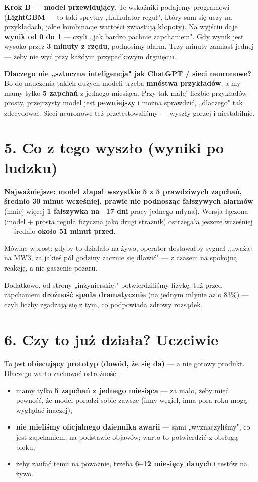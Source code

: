 \documentclass[12pt,a4paper]{article}
\newcommand{\waz}[1]{\textcolor{akcent}{\textbf{#1}}}
\begin{document}
\textbf{Krok B --- model przewidujący.} Te wskaźniki podajemy programowi
(\waz{LightGBM} --- to taki sprytny „kalkulator reguł", który sam się uczy na
przykładach, jakie kombinacje wartości zwiastują kłopoty). Na wyjściu daje
\waz{wynik od 0 do 1} --- czyli „jak bardzo pachnie zapchaniem". Gdy wynik jest
wysoko przez \waz{3 minuty z rzędu}, podnosimy alarm. Trzy minuty zamiast jednej ---
żeby nie wyć przy każdym przypadkowym drgnięciu.

\begin{infobox}
\textbf{Dlaczego nie „sztuczna inteligencja" jak ChatGPT / sieci neuronowe?}
Bo do nauczenia takich dużych modeli trzeba \waz{mnóstwa przykładów}, a my mamy
tylko \waz{5 zapchań} z jednego miesiąca. Przy tak małej liczbie przykładów prosty,
przejrzysty model jest \waz{pewniejszy} i można sprawdzić, „dlaczego" tak zdecydował.
Sieci neuronowe też przetestowaliśmy --- wyszły gorzej i niestabilnie.
\end{infobox}

\section*{5. Co z tego wyszło (wyniki po ludzku)}

\begin{infobox}
\textbf{Najważniejsze: model złapał \waz{wszystkie 5 z 5} prawdziwych zapchań,
średnio \waz{30 minut wcześniej}, prawie nie podnosząc fałszywych alarmów}
(mniej więcej \waz{1 fałszywka na ~17 dni} pracy jednego młyna). Wersja
łączona (model + prosta reguła fizyczna jako drugi strażnik) ostrzegała jeszcze
wcześniej --- średnio \waz{około 51 minut przed}.
\end{infobox}

Mówiąc wprost: gdyby to działało na żywo, operator dostawałby sygnał „uważaj na MW3,
za jakieś pół godziny zacznie się dławić" --- z czasem na spokojną reakcję, a nie
gaszenie pożaru.

Dodatkowo, od strony „inżynierskiej" potwierdziliśmy fizykę: tuż przed zapchaniem
\waz{drożność spada dramatycznie} (na jednym młynie aż o 83\%) --- czyli liczby
zgadzają się z tym, co podpowiada zdrowy rozsądek.

\section*{6. Czy to już działa? Uczciwie}

To jest \waz{obiecujący prototyp (dowód, że się da)} --- a nie gotowy produkt.
Dlaczego warto zachować ostrożność:
\begin{itemize}
  \item mamy tylko \waz{5 zapchań z jednego miesiąca} --- za mało, żeby mieć pewność,
        że model poradzi sobie zawsze (inny węgiel, inna pora roku mogą wyglądać inaczej);
  \item \waz{nie mieliśmy oficjalnego dziennika awarii} --- sami „wyznaczyliśmy", co jest
        zapchaniem, na podstawie objawów; warto to potwierdzić z obsługą bloku;
  \item żeby zaufać temu na poważnie, trzeba \waz{6--12 miesięcy danych} i testów na żywo.
\end{itemize}
\end{document}
